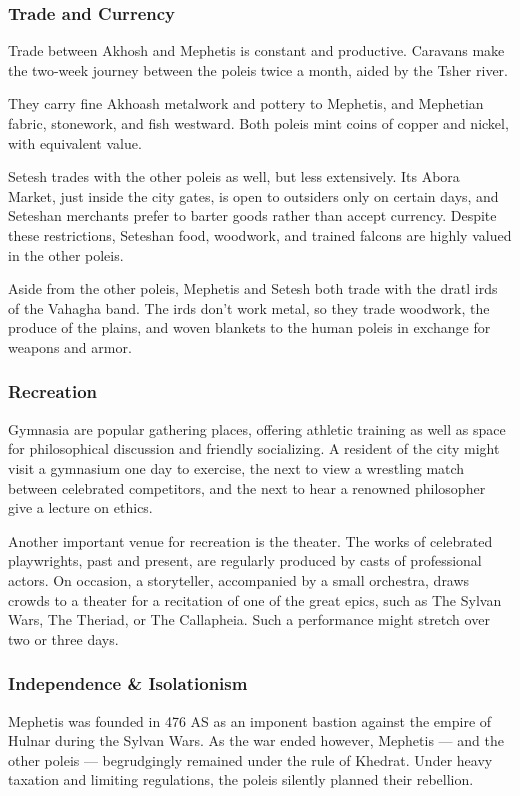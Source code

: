 \subsubsection{Trade and Currency}
Trade between Akhosh and Mephetis is constant and productive.
Caravans make the two-week journey between the poleis twice a month, aided by the Tsher river.

They carry fine Akhoash metalwork and pottery to Mephetis, and Mephetian fabric, stonework, and fish westward.
Both poleis mint coins of copper and nickel, with equivalent value.

Setesh trades with the other poleis as well, but less extensively.
Its Abora Market, just inside the city gates, is open to outsiders only on certain days, and Seteshan merchants prefer to barter goods rather than accept currency.
Despite these restrictions, Seteshan food, woodwork, and trained falcons are highly valued in the other poleis.

Aside from the other poleis, Mephetis and Setesh both trade with the dratl irds of the Vahagha band.
The irds don't work metal, so they trade woodwork, the produce of the plains, and woven blankets to the human poleis in exchange for weapons and armor.

\subsubsection{Recreation}

Gymnasia are popular gathering places, offering athletic training as well as space for philosophical discussion and friendly socializing.
A resident of the city might visit a gymnasium one day to exercise, the next to view a wrestling match between celebrated competitors, and the next to hear a renowned philosopher give a lecture on ethics.

Another important venue for recreation is the theater.
The works of celebrated playwrights, past and present, are regularly produced by casts of professional actors.
On occasion, a storyteller, accompanied by a small orchestra, draws crowds to a theater for a recitation of one of the great epics, such as The Sylvan Wars, The Theriad, or The Callapheia.
Such a performance might stretch over two or three days.

\subsubsection{Independence \& Isolationism}
Mephetis was founded in 476 AS as an imponent bastion against the empire of Hulnar during the Sylvan Wars.
As the war ended however, Mephetis --- and the other poleis --- begrudgingly remained under the rule of Khedrat.
Under heavy taxation and limiting regulations, the poleis silently planned their rebellion.

